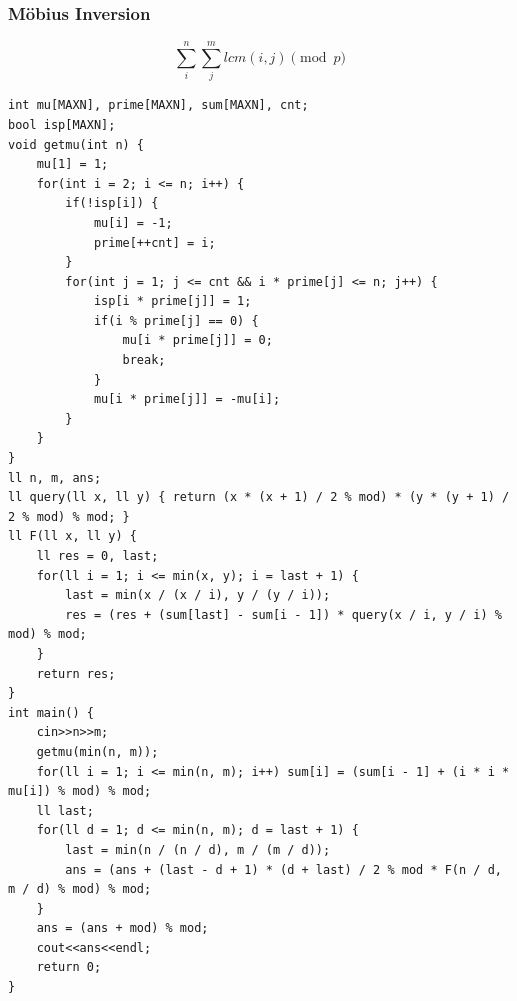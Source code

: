 \documentclass[10pt]{ctexart}
\begin{document}
{\subsubsection{Möbius Inversion}
$$
\sum_i^n \sum_j^m lcm(i,j)\pmod p
$$
\begin{lstlisting}
int mu[MAXN], prime[MAXN], sum[MAXN], cnt;
bool isp[MAXN];
void getmu(int n) {
    mu[1] = 1;
    for(int i = 2; i <= n; i++) {
        if(!isp[i]) {
            mu[i] = -1;
            prime[++cnt] = i;
        }
        for(int j = 1; j <= cnt && i * prime[j] <= n; j++) {
            isp[i * prime[j]] = 1;
            if(i % prime[j] == 0) {
                mu[i * prime[j]] = 0;
                break;
            }
            mu[i * prime[j]] = -mu[i];
        }
    }
}
ll n, m, ans;
ll query(ll x, ll y) { return (x * (x + 1) / 2 % mod) * (y * (y + 1) / 2 % mod) % mod; }
ll F(ll x, ll y) {
    ll res = 0, last;
    for(ll i = 1; i <= min(x, y); i = last + 1) {
        last = min(x / (x / i), y / (y / i));
        res = (res + (sum[last] - sum[i - 1]) * query(x / i, y / i) % mod) % mod;
    }
    return res;
}
int main() {
    cin>>n>>m;
    getmu(min(n, m));
    for(ll i = 1; i <= min(n, m); i++) sum[i] = (sum[i - 1] + (i * i * mu[i]) % mod) % mod;
    ll last;
    for(ll d = 1; d <= min(n, m); d = last + 1) {
        last = min(n / (n / d), m / (m / d));
        ans = (ans + (last - d + 1) * (d + last) / 2 % mod * F(n / d, m / d) % mod) % mod;
    }
    ans = (ans + mod) % mod;
    cout<<ans<<endl;
    return 0;
}
\end{lstlisting}
}
\end{document}
